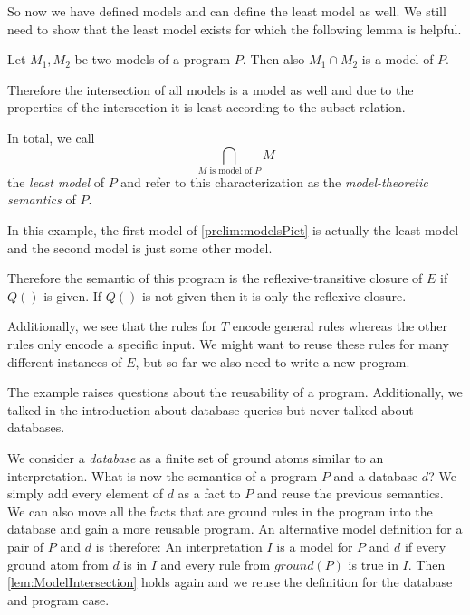 So now we have defined models and can define the least model as well. We still need to show that the least model exists for which the following lemma is helpful.

\begin{lemma}\label{lem:ModelIntersection}
Let $M_1, M_2$ be two models of a program $P$. Then also $M_1 \cap M_2$ is a model of $P$.
\end{lemma}

Therefore the intersection of all models is a model as well and due to the properties of the intersection it is least according to the subset relation. 

In total, we call \[\bigcap_{\text{$M$ is model of $P$}} M\] the \textit{least model} of $P$ and refer to this characterization as the \textit{model-theoretic semantics} of $P$.

\begin{contexample}
    In this example, the first model of \cref{prelim:modelsPict} is actually the least model and the second model is just some other model.

    Therefore the semantic of this program is the reflexive-transitive closure of $E$ if $Q()$ is given.
    If $Q()$ is not given then it is only the reflexive closure.

    Additionally, we see that the rules for $T$ encode general rules whereas the other rules only encode a specific input. We might want to reuse these rules for many different instances of $E$, but so far we also need to write a new program.
\end{contexample}

The example raises questions about the reusability of a program. Additionally, we talked in the introduction about database queries but never talked about databases. 

We consider a \textit{database} as a finite set of ground atoms similar to an interpretation. What is now the semantics of a program $P$ and a database $d$? We simply add every element of $d$ as a fact to $P$ and reuse the previous semantics. We can also move all the facts that are ground rules in the program into the database and gain a more reusable program.
An alternative model definition for a pair of $P$ and $d$ is therefore: An interpretation $I$ is a model for $P$ and $d$ if every ground atom from $d$ is in $I$ and every rule from $ground(P)$ is true in $I$. Then \cref{lem:ModelIntersection} holds again and we reuse the definition for the database and program case.

